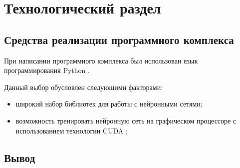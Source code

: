 \section{Технологический раздел}

\subsection{Средства реализации программного комплекса}

При написании программного комплекса был использован язык программирования Python \cite{python}.

Данный выбор обусловлен следующими факторами:
\begin{itemize}
	\item широкий набор библиотек для работы с нейронными сетями;
	\item возможность тренировать нейронную сеть на графическом процессоре с использованием технологии CUDA \cite{cuda};
\end{itemize}

\subsection*{Вывод}